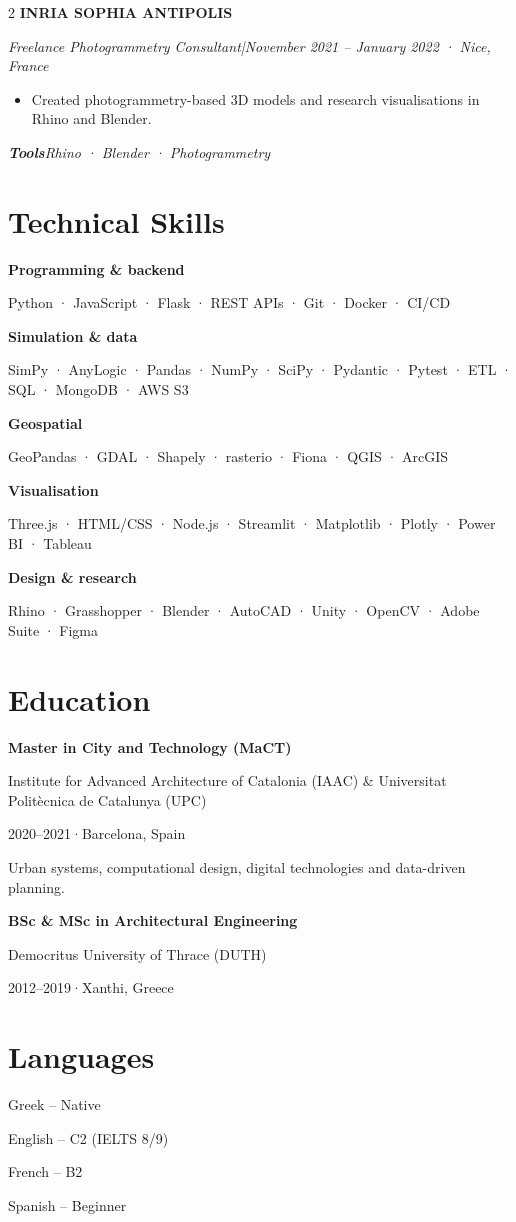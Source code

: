 \documentclass[10pt,a4paper]{article}
\newcommand{\role}[3]{%
  {\large\bfseries\color{teal}#1}\par
  {\small\itshape\color{muted}#2\hspace{4pt}|\hspace{4pt}#3}\par\vspace{1pt}}
\newcommand{\skill}[2]{\textbf{\color{teal}#1}\par #2\par\vspace{4pt}}
\begin{document}
\begin{paracol}{2}
\role{INRIA SOPHIA ANTIPOLIS}{Freelance Photogrammetry Consultant}{November 2021 -- January 2022 · Nice, France}
\begin{itemize}
\item Created photogrammetry-based 3D models and research visualisations in Rhino and Blender.
\end{itemize}
{\footnotesize\itshape\color{muted}\textbf{Tools}\quad Rhino · Blender · Photogrammetry}

\switchcolumn
\section*{Technical Skills}
\skill{Programming \& backend}{Python · JavaScript · Flask · REST APIs · Git · Docker · CI/CD}
\skill{Simulation \& data}{SimPy · AnyLogic · Pandas · NumPy · SciPy · Pydantic · Pytest · ETL · SQL · MongoDB · AWS S3}
\skill{Geospatial}{GeoPandas · GDAL · Shapely · rasterio · Fiona · QGIS · ArcGIS}
\skill{Visualisation}{Three.js · HTML/CSS · Node.js · Streamlit · Matplotlib · Plotly · Power BI · Tableau}
\skill{Design \& research}{Rhino · Grasshopper · Blender · AutoCAD · Unity · OpenCV · Adobe Suite · Figma}

\section*{Education}
\textbf{\color{teal}Master in City and Technology (MaCT)}\par
Institute for Advanced Architecture of Catalonia (IAAC) \& Universitat Politècnica de Catalunya (UPC)\par
{\footnotesize\color{muted}2020--2021\quad·\quad Barcelona, Spain}\par
Urban systems, computational design, digital technologies and data-driven planning.\par\vspace{5pt}
\textbf{\color{teal}BSc \& MSc in Architectural Engineering}\par
Democritus University of Thrace (DUTH)\par
{\footnotesize\color{muted}2012--2019\quad·\quad Xanthi, Greece}

\section*{Languages}
Greek -- Native\par English -- C2 (IELTS 8/9)\par French -- B2\par Spanish -- Beginner
\end{paracol}
\end{document}
